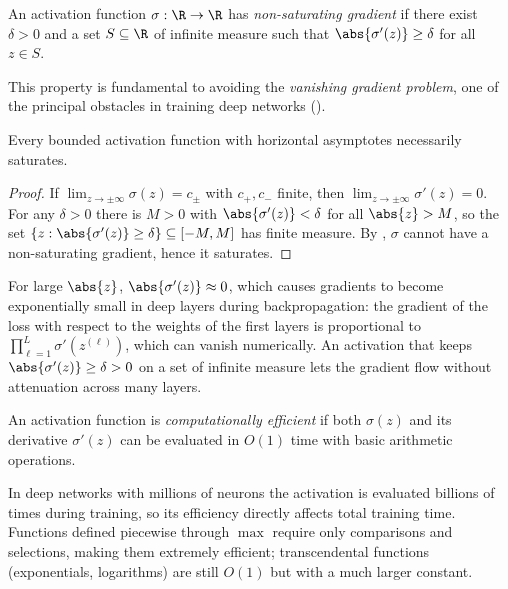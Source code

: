 \begin{definition}
\label{def:found:nonsaturating}
An activation function $\sigma : \R \to \R$ has \emph{non-saturating gradient}
if there exist $\delta > 0$ and a set $S \subseteq \R$ of infinite measure such
that $\abs{\sigma'(z)} \ge \delta$ for all $z \in S$.
\end{definition}

This property is fundamental to avoiding the \emph{vanishing gradient problem},
one of the principal obstacles in training deep networks
().

\begin{corollary}
\label{cor:found:saturates}
Every bounded activation function with horizontal asymptotes necessarily
saturates.
\end{corollary}

\begin{proof}
If $\lim_{z\to\pm\infty}\sigma(z) = c_{\pm}$ with $c_+, c_-$ finite, then
$\lim_{z\to\pm\infty}\sigma'(z) = 0$. For any $\delta > 0$ there is $M > 0$ with
$\abs{\sigma'(z)} < \delta$ for all $\abs{z} > M$, so the set
$\{z : \abs{\sigma'(z)} \ge \delta\} \subseteq [-M, M]$ has finite measure. By
, $\sigma$ cannot have a non-saturating gradient,
hence it saturates.
\end{proof}

For large $\abs{z}$, $\abs{\sigma'(z)} \approx 0$, which causes gradients to
become exponentially small in deep layers during backpropagation: the gradient
of the loss with respect to the weights of the first layers is proportional to
$\prod_{\ell=1}^L \sigma'(z^{(\ell)})$, which can vanish numerically. An
activation that keeps $\abs{\sigma'(z)} \ge \delta > 0$ on a set of infinite
measure lets the gradient flow without attenuation across many layers.

\begin{definition}
\label{def:found:efficiency}
An activation function is \emph{computationally efficient} if both $\sigma(z)$
and its derivative $\sigma'(z)$ can be evaluated in $O(1)$ time with basic
arithmetic operations.
\end{definition}

In deep networks with millions of neurons the activation is evaluated billions
of times during training, so its efficiency directly affects total training
time. Functions defined piecewise through $\max$ require only comparisons and
selections, making them extremely efficient; transcendental functions
(exponentials, logarithms) are still $O(1)$ but with a much larger constant.

